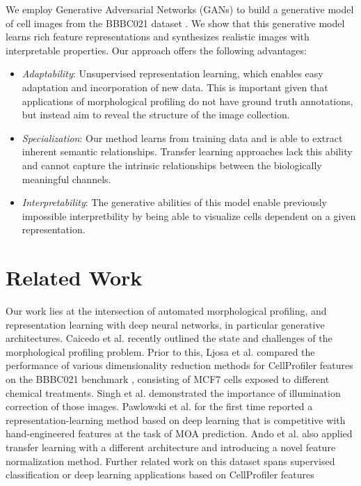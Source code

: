 \documentclass{article}
\begin{document}
We employ Generative Adversarial Networks (GANs) \cite{goodfellow2014generative}
to build a generative model of cell images from the BBBC021 dataset
\cite{Caie2010,Ljosa2012}.  We show that this generative model learns rich
feature representations and synthesizes realistic images with interpretable
properties. Our approach offers the following advantages:

\begin{itemize}
  \item \emph{Adaptability}: Unsupervised representation learning, which enables easy adaptation and incorporation of new data. This is important given that applications of morphological profiling do not have ground truth annotations, but instead aim to reveal the structure of the image collection.
  \item \emph{Specialization}: Our method learns from training data and is able to extract inherent semantic relationships. Transfer learning approaches lack this ability and cannot capture the intrinsic relationships between the biologically meaningful channels.
  \item \emph{Interpretability}: The generative abilities of this model enable previously impossible interpretbility by being able to visualize cells dependent on a given representation.
\end{itemize}

\section{Related Work}

Our work lies at the intersection of automated morphological profiling, and
representation learning with deep neural networks, in particular generative
architectures. Caicedo et al. \cite{caicedo2017data} recently outlined the state
and challenges of the morphological profiling problem. Prior to this, Ljosa et
al. \cite{Ljosa2013} compared the performance of various dimensionality
reduction methods for CellProfiler features on the BBBC021 benchmark
\cite{Caie2010,Ljosa2012}, consisting of MCF7 cells exposed to different
chemical treatments. Singh et al. \cite{Singh2014} demonstrated the importance
of illumination correction of those images. Pawlowski et al.
\cite{pawlowski2016automating} for the first time reported a
representation-learning method based on deep learning that is competitive with
hand-engineered features at the task of MOA prediction. Ando et al.
\cite{ando2017improving} also applied transfer learning with a different
architecture and introducing a novel feature normalization method. Further
related work on this dataset spans supervised classification \cite{Kraus2016a}
or deep learning applications based on CellProfiler features
\cite{Kandaswamy2016,Zamparo2015}
\end{document}
